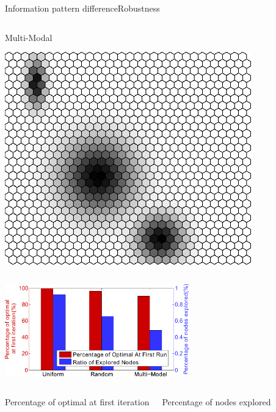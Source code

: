 \begin{frame}{Information pattern difference}{Robustness}
\begin{columns}
\begin{block}{Multi-Modal}
\begin{center}
\includegraphics[width=0.8\textwidth]{./figure/ENV_MM}
\end{center}
\end{block}

\end{columns}

\begin{center}
\includegraphics[width=0.6\textwidth]{./figure/EnvPerform}
\end{center}

\begin{columns}
\begin{center}
{\small
\textcolor{metric-OFI}{Percentage of optimal at first iteration}
}
\end{center}
\begin{center}
{\small
\textcolor{metric-NE}{Percentage of nodes explored}
}
\end{center}
\end{columns}


\end{frame}


